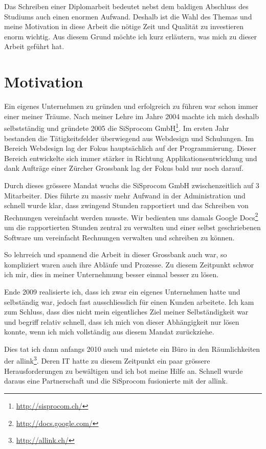 Das Schreiben einer Diplomarbeit bedeutet nebst dem baldigen Abschluss des Studiums
auch einen enormen Aufwand. Deshalb ist die Wahl des Themas und meine
Motivation in diese Arbeit die nötige Zeit und Qualität zu investieren enorm
wichtig. Aus diesem Grund möchte ich kurz erläutern, was mich zu dieser
Arbeit geführt hat.

\section{Motivation}
Ein eigenes Unternehmen zu gründen und erfolgreich zu führen war schon immer
einer meiner Träume. Nach meiner Lehre im Jahre 2004 machte ich mich deshalb
selbstständig und gründete 2005 die SiSprocom GmbH\footnote{\url{http://sisprocom.ch/}}. 
Im ersten Jahr bestanden
die Tätigkeitsfelder überwiegend aus Webdesign und Schulungen. Im Bereich
Webdesign lag der Fokus hauptsächlich auf der Programmierung. Dieser Bereich 
entwickelte sich immer stärker in Richtung 
Applikationsentwicklung und dank Aufträge einer Zürcher Grossbank 
lag der Fokus bald nur noch darauf.

Durch dieses grössere Mandat wuchs die SiSprocom GmbH zwischenzeitlich
auf 3 Mitarbeiter. Dies führte zu massiv mehr Aufwand in der Administration
und schnell wurde klar, dass zwingend Stunden rapportiert und das Schreiben
von Rechnungen vereinfacht werden musste. Wir bedienten uns damals Google 
Docs\footnote{\url{http://docs.google.com/}} um die rapportierten Stunden zentral zu 
verwalten und einer selbst geschriebenen Software um vereinfacht Rechnungen 
verwalten und schreiben zu können.

So lehrreich und spannend die Arbeit in dieser Grossbank auch war, so kompliziert
waren auch ihre Abläufe und Prozesse. Zu diesem Zeitpunkt schwor ich mir, dies
in meiner Unternehmung besser einmal besser zu lösen.

Ende 2009 realisierte ich, dass ich zwar ein eigenes Unternehmen hatte und
selbständig war, jedoch fast ausschliesslich für einen Kunden arbeitete.
Ich kam zum Schluss, dass dies nicht mein eigentliches Ziel meiner Selbständigkeit 
war und begriff
relativ schnell, dass ich mich von dieser Abhängigkeit nur lösen konnte, wenn
ich mich vollständig aus diesem Mandat zurückziehe.

Dies tat ich dann anfangs 2010 auch und mietete ein Büro in den Räumlichkeiten
der allink\footnote{\url{http://allink.ch/}}. Deren IT hatte zu diesem Zeitpunkt 
ein paar grössere
Herausforderungen zu bewältigen und ich bot meine Hilfe an. Schnell wurde
daraus eine Partnerschaft und die SiSprocom fusionierte mit der allink.

